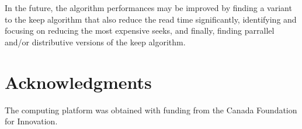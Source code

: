 \documentclass[sigconf, nonacm]{acmart}
\begin{document}
In the future, the algorithm performances may be improved by finding a variant
to the keep algorithm that also reduce the read time significantly,
identifying and focusing on reducing the most expensive seeks,
and finally, finding parrallel and/or distributive versions of the keep algorithm.

\section{Acknowledgments}

The computing platform was obtained with funding from the Canada Foundation for Innovation.



\end{document}
